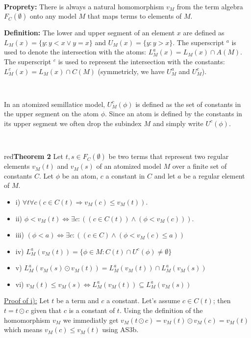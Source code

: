 \documentclass[a4paper, 11pt]{article}
\begin{document}
\

\begin{tcolorbox} 
	\textbf{Proprety:} There is always a natural homomorphism $v_M$ from the term algebra $F_C(\emptyset)$ onto any model $M$ that maps terms to elements of $M$.
\end{tcolorbox}

\begin{tcolorbox} 
	\textbf{Definition:} The lower and upper segment of an element $x$ are defined as $L_M(x) =\{y: y < x \lor y = x\}$ and $U_M(x) =\{y : y > x\}$. The superscript $^a$ is used to denote the intersection with the atoms: $L_M^a(x) = L_M(x) \cap A(M)$. The superscript $^c$ is used to represent the intersection with the constants: $L_M^c(x) = L_M(x) \cap C(M)$ (symmetricly, we have $U_M^a$ and $U_M^c$).

	\

	In an atomized semillatice model, $U_M^c(\phi)$ is defined as the set of constants in the upper segment on the atom $\phi$. Since an atom is defined by the constants in its upper segment we often drop the subindex $M$ and simply write $U^c(\phi)$.
\end{tcolorbox} 
\

\begin{mybox}{red}{\textbf{Theorem 2}}
	Let $t,s \in F_C(\emptyset)$ be two terms that represent two regular elements $v_M(t)$ and $v_M(s)$ of an atomized model $M$ over a finite set of constants $C$. Let $\phi$ be an atom, $c$ a constant in $C$ and let $a$ be a regular element of $M$.

	\begin{itemize} 
		\item i) $\forall t \forall c ( c \in C(t) \Rightarrow v_M(c) \leq v_M(t))$.
		\item ii) $\phi < v_M(t) \Leftrightarrow \exists c: ((c \in C(t)) \land (\phi < v_M(c)))$.
		\item iii) $(\phi < a) \Leftrightarrow \exists c: ((c \in C) \land (\phi < v_M(c) \leq a))$
		\item iv) $L_M^a(v_M(t)) =\{\phi \in M : C(t) \cap U^c(\phi) \neq \emptyset\}$
		\item v) $L_M^a(v_M(s) \odot v_M(t)) = L_M^a(v_M(t)) \cap L_M^a(v_M(s))$
		\item vi) $v_M(t) \leq v_M(s) \Leftrightarrow L_M^a(v_M(t)) \subseteq L_M^a(v_M(s))$
	\end{itemize}
\end{mybox}

\noindent 
\underline{Proof of i):} Let $t$ be a term and $c$ a constant. Let's assume $c \in C(t)$; then $t = t \odot c$ given that $c$ is a constant of $t$. Using the definition of the homomorphism $v_M$ we immediatly get $v_M(t \odot c) = v_M(t) \odot v_M(c) = v_M(t)$ which means $v_M(c) \leq v_M(t)$ using AS3b.
\end{document}
